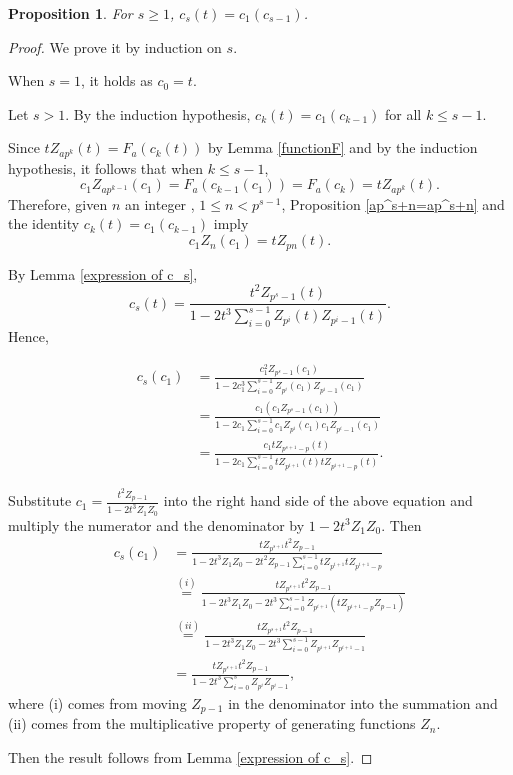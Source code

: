 \documentclass[11 pt]{amsart}
\theoremstyle{plain}
\newtheorem{prop}[thm]{Proposition}
\theoremstyle{definition}
\theoremstyle{remark}
\begin{document}
\begin{prop} \label{s=1+s-1}
    For $s \ge 1$, $c_s(t)=c_1(c_{s-1})$.
\end{prop}

\begin{proof}
    We prove it by induction on $s$.

    When $s=1$, it holds as $c_0=t$.

    Let $s>1$.    
    By the induction hypothesis,  $c_k(t)=c_1(c_{k-1})$ for all $k \le s-1$.

    Since $tZ_{ap^k}(t)=F_a(c_k(t))$ by Lemma \ref{functionF} and by the induction hypothesis, it follows that when $k \le s-1$, $$        c_1Z_{ap^{k-1}}(c_1)=F_a(c_{k-1}(c_1))=F_a(c_k)=tZ_{ap^k}(t).    $$ Therefore, given  $n$ an integer , $1\le n <p^{s-1}$,  Proposition \ref{ap^s+n=ap^s+n}  and the identity $c_k(t)=c_1(c_{k-1})$ imply 
\begin{equation}\label{c_1.levels.up}
    c_1Z_{n}(c_1)=tZ_{pn}(t).
\end{equation}

By Lemma \ref{expression of c_s}, $$c_s(t)=\frac{t^2Z_{p^s-1}(t)}{1-2t^3\sum_{i=0}^{s-1}Z_{p^i}(t)Z_{p^i-1}(t)}.$$
Hence, 

\begin{align*}
    c_s(c_1)&=\frac{c_1^2Z_{p^s-1}(c_1)}{1-2c_1^3\sum_{i=0}^{s-1}Z_{p^i}(c_1)Z_{p^i-1}(c_1)}\\
    &=\frac{c_1(c_1Z_{p^s-1}(c_1))}{1-2c_1\sum_{i=0}^{s-1}c_1Z_{p^i}(c_1)c_1Z_{p^i-1}(c_1)}\\
    &=\frac{c_1tZ_{p^{s+1}-p}(t)}{1-2c_1\sum_{i=0}^{s-1}tZ_{p^{i+1}}(t)tZ_{p^{i+1}-p}(t)}.
\end{align*}

Substitute $c_1=\frac{t^2Z_{p-1}}{1-2t^3Z_1Z_0}$ into the right hand side of the above equation and multiply the numerator and the  denominator by $1-2t^3Z_1 Z_0$. Then \begin{align*}
c_s(c_1)&=\frac{tZ_{p^{s+1}}t^2Z_{p-1}}{1-2t^3Z_1Z_0-2t^2Z_{p-1}\sum_{i=0}^{s-1}tZ_{p^{i+1}}tZ_{p^{i+1}-p}}\\
&\stackrel{(i)}{=}  \frac{tZ_{p^{s+1}}t^2Z_{p-1}}{1-2t^3Z_1Z_0-2t^3\sum_{i=0}^{s-1}Z_{p^{i+1}}(tZ_{p^{i+1}-p}Z_{p-1})}\\
&\stackrel{(ii)}{=}\frac{tZ_{p^{s+1}}t^2Z_{p-1}}{1-2t^3Z_1Z_0-2t^3\sum_{i=0}^{s-1}Z_{p^{i+1}}Z_{p^{i+1}-1}}\\
&=\frac{tZ_{p^{s+1}}t^2Z_{p-1}}{1-2t^3\sum_{i=0}^{s}Z_{p^{i}}Z_{p^{i}-1}},
\end{align*}
where (i) comes from moving $Z_{p-1}$ in the denominator into the summation and (ii) comes from the multiplicative property of generating functions $Z_n$.

Then the result follows from Lemma \ref{expression of c_s}. 
    \end{proof}
\end{document}
